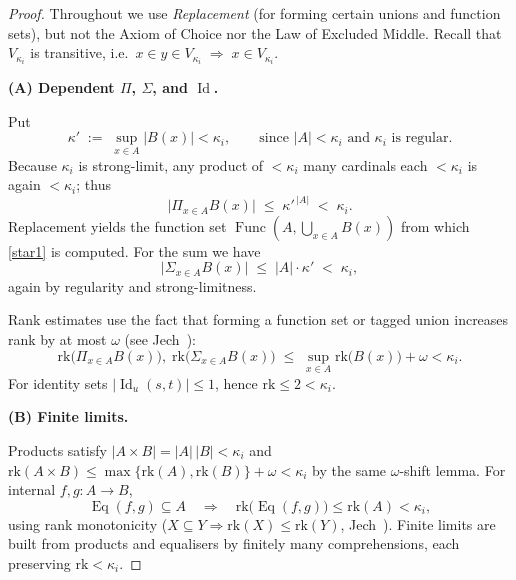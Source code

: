 \documentclass[a4paper,11pt]{article}
\newcommand{\Eq}{\operatorname{Eq}}          %
\begin{document}
\begin{proof}
Throughout we use \emph{Replacement} (for forming certain unions and
function sets), but not the Axiom of Choice nor the Law of Excluded
Middle.  Recall that $V_{\kappa_i}$ is transitive, i.e.\
$x\in y\in V_{\kappa_i}\;\Rightarrow\;x\in V_{\kappa_i}$.

\smallskip
\textbf{(A) Dependent $\Pi$, $\Sigma$, and $\operatorname{Id}$.}

Put
\[
  \kappa'\;:=\;
  \sup_{x\in A}|B(x)|<\kappa_i ,
  \qquad
  \text{since }|A|<\kappa_i\text{ and }\kappa_i\text{ is regular.}
\]
Because $\kappa_i$ is strong-limit, any product of
$<\!\kappa_i$ many cardinals each $<\!\kappa_i$ is again $<\kappa_i$;
thus
\begin{equation}\label{star1}
  \bigl|\Pi_{x\in A}B(x)\bigr|
  \;\le\;
  \kappa'^{\,|A|}
  \;<\;
  \kappa_i .
\end{equation}
Replacement yields the function set
$\operatorname{Func}(A,\bigcup_{x\in A}B(x))$ from which
\eqref{star1} is computed.  
For the sum we have
\begin{equation}\label{star2}
  \bigl|\Sigma_{x\in A}B(x)\bigr|
  \;\le\;
  |A|\cdot\kappa'
  \;<\;
  \kappa_i ,
\end{equation}
again by regularity and strong-limitness.

Rank estimates use the fact that forming a function set or tagged
union increases rank by at most $\omega$ (see Jech~\cite[Ex.\ 2.14]{Lurie:HTT}):
\begin{equation}\label{star3}
  \mathrm{rk}\!\bigl(\Pi_{x\in A}B(x)\bigr),
  \;
  \mathrm{rk}\!\bigl(\Sigma_{x\in A}B(x)\bigr)
  \;\le\;
  \sup_{x\in A}\mathrm{rk}\!\bigl(B(x)\bigr)+\omega
  <\kappa_i .
\end{equation}
For identity sets
$|\operatorname{Id}_u(s,t)|\le 1$, hence
$\mathrm{rk}\le 2<\kappa_i$.

\smallskip
\textbf{(B) Finite limits.}

Products satisfy
$
  |A\times B|=|A|\,|B|<\kappa_i
$
and
$
  \mathrm{rk}(A\times B)
  \le \max\{\mathrm{rk}(A),\mathrm{rk}(B)\}+\omega<\kappa_i
$
by the same $\omega$-shift lemma.  
For internal $f,g:A\to B$,
\[
  \Eq(f,g)\subseteq A
  \quad\Longrightarrow\quad
  \mathrm{rk}\bigl(\Eq(f,g)\bigr)
  \le \mathrm{rk}(A)
  <\kappa_i ,
\]
using rank monotonicity
($X\subseteq Y\Rightarrow\mathrm{rk}(X)\le\mathrm{rk}(Y)$,
Jech~\cite[Ex.\ 2.8]{Lurie:HTT}).
Finite limits are built from products and equalisers by finitely many
comprehensions, each preserving $\mathrm{rk}<\kappa_i$.


\end{proof}
\end{document}
